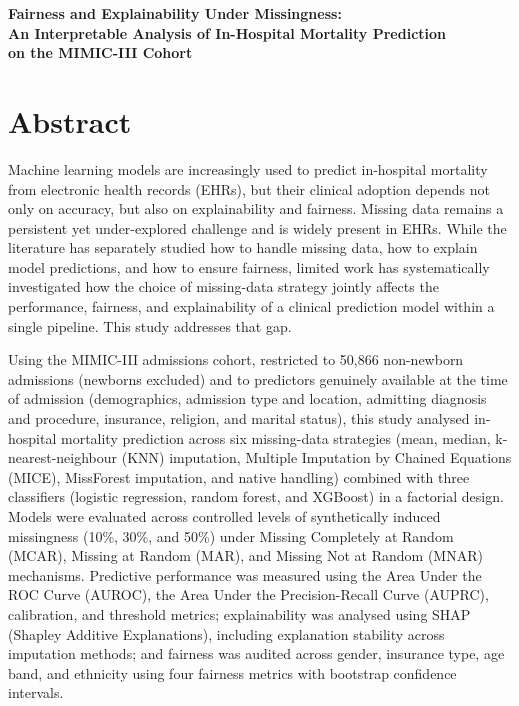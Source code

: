 \documentclass[12pt,a4paper]{report}
\begin{document}
\begin{titlepage}
\centering
\vspace*{1cm}
{\LARGE\bfseries Fairness and Explainability Under Missingness:\\[0.3cm]
An Interpretable Analysis of In-Hospital Mortality Prediction\\ on the MIMIC-III Cohort\par}
\vspace{2cm}

\end{titlepage}

\tableofcontents
\listoftables
\listoffigures


\chapter*{Abstract}
Machine learning models are increasingly used to predict in-hospital mortality from electronic health records (EHRs), but their clinical adoption depends not only on accuracy, but also on explainability and fairness. Missing data remains a persistent yet under-explored challenge and is widely present in EHRs. While the literature has separately studied how to handle missing data, how to explain model predictions, and how to ensure fairness, limited work has systematically investigated how the choice of missing-data strategy jointly affects the performance, fairness, and explainability of a clinical prediction model within a single pipeline. This study addresses that gap.

Using the MIMIC-III admissions cohort, restricted to 50,866 non-newborn admissions (newborns excluded) and to predictors genuinely available at the time of admission (demographics, admission type and location, admitting diagnosis and procedure, insurance, religion, and marital status), this study analysed in-hospital mortality prediction across six missing-data strategies (mean, median, k-nearest-neighbour (KNN) imputation, Multiple Imputation by Chained Equations (MICE), MissForest imputation, and native handling) combined with three classifiers (logistic regression, random forest, and XGBoost) in a factorial design. Models were evaluated across controlled levels of synthetically induced missingness (10\%, 30\%, and 50\%) under Missing Completely at Random (MCAR), Missing at Random (MAR), and Missing Not at Random (MNAR) mechanisms. Predictive performance was measured using the Area Under the ROC Curve (AUROC), the Area Under the Precision-Recall Curve (AUPRC), calibration, and threshold metrics; explainability was analysed using SHAP (Shapley Additive Explanations), including explanation stability across imputation methods; and fairness was audited across gender, insurance type, age band, and ethnicity using four fairness metrics with bootstrap confidence intervals.
\end{document}
